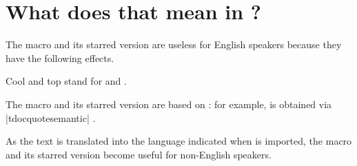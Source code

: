 \documentclass[10pt, a4paper]{article}
\begin{document}
\section{What does that mean in ?}

The macro  and its starred version are useless for English speakers because they have the following effects.

\begin{tdoclatex}
Cool and top stand for  and .
\end{tdoclatex}


The macro  and its starred version are based on  : for example,  is obtained via \tdocinlatex|tdocquote{semantic}| .


\begin{tdocnote}
	As the text  is translated into the language indicated when  is imported, the macro  and its starred version become useful for non-English speakers.
\end{tdocnote}
\end{document}

